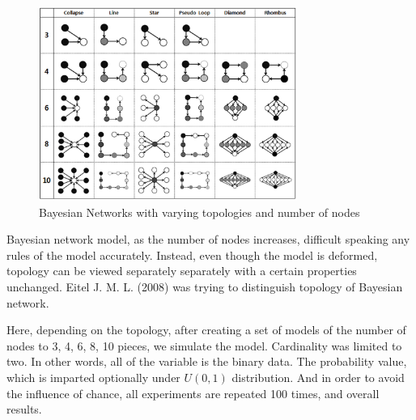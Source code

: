 	\begin{figure}[!h]
	\centering
		\includegraphics[height=180pt]{Topologies}
		\caption{Bayesian Networks with varying topologies and number of nodes}
	\end{figure}

Bayesian network model, as the number of nodes increases, difficult speaking any rules of the model accurately. Instead, even though the model is deformed, topology can be viewed separately separately with a certain properties unchanged. Eitel J. M. L. (2008) was trying to distinguish topology of Bayesian network.

Here, depending on the topology, after creating a set of models of the number of nodes to 3, 4, 6, 8, 10 pieces, we simulate the model. Cardinality was limited to two. In other words, all of the variable is the binary data. The probability value, which is imparted optionally under $ U (0,1) $ distribution. And in order to avoid the influence of chance, all experiments are repeated 100 times, and overall results.